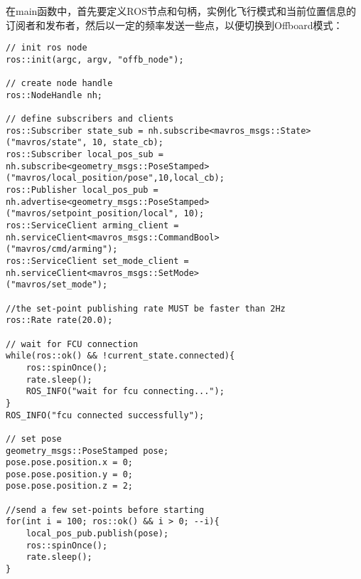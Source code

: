 在main函数中，首先要定义ROS节点和句柄，实例化飞行模式和当前位置信息的订阅者和发布者，然后以一定的频率发送一些点，以便切换到Offboard模式：
\begin{verbatim}
// init ros node
ros::init(argc, argv, "offb_node");

// create node handle
ros::NodeHandle nh;

// define subscribers and clients
ros::Subscriber state_sub = nh.subscribe<mavros_msgs::State>
("mavros/state", 10, state_cb);
ros::Subscriber local_pos_sub = nh.subscribe<geometry_msgs::PoseStamped>
("mavros/local_position/pose",10,local_cb);
ros::Publisher local_pos_pub = nh.advertise<geometry_msgs::PoseStamped>
("mavros/setpoint_position/local", 10);
ros::ServiceClient arming_client = nh.serviceClient<mavros_msgs::CommandBool>
("mavros/cmd/arming");
ros::ServiceClient set_mode_client = nh.serviceClient<mavros_msgs::SetMode>
("mavros/set_mode");

//the set-point publishing rate MUST be faster than 2Hz
ros::Rate rate(20.0);

// wait for FCU connection
while(ros::ok() && !current_state.connected){
    ros::spinOnce();
    rate.sleep();
    ROS_INFO("wait for fcu connecting...");
}
ROS_INFO("fcu connected successfully");

// set pose
geometry_msgs::PoseStamped pose;
pose.pose.position.x = 0;
pose.pose.position.y = 0;
pose.pose.position.z = 2;

//send a few set-points before starting
for(int i = 100; ros::ok() && i > 0; --i){
    local_pos_pub.publish(pose);
    ros::spinOnce();
    rate.sleep();
}
\end{verbatim}

